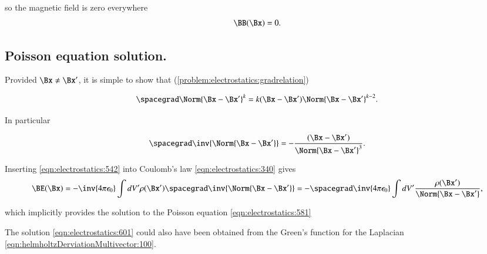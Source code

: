 so the magnetic field is zero everywhere
\begin{dmath}\label{eqn:electrostatics:320}
\BB(\Bx) = 0.
\end{dmath}


\subsection{Poisson equation solution.}

Provided \( \Bx \ne \Bx' \), it is simple to show that (\cref{problem:electrostatics:gradrelation})

\begin{dmath}\label{eqn:electrostatics:541}
\spacegrad \Norm{\Bx - \Bx'}^k = k (\Bx - \Bx') \Norm{ \Bx - \Bx' }^{k-2}.
\end{dmath}

In particular

\begin{dmath}\label{eqn:electrostatics:542}
\spacegrad \inv{\Norm{\Bx - \Bx'}} = - \frac{(\Bx - \Bx')}{\Norm{ \Bx - \Bx' }^{3}}.
\end{dmath}

Inserting \cref{eqn:electrostatics:542} into Coulomb's law \cref{eqn:electrostatics:340} gives
\begin{dmath}\label{eqn:electrostatics:661}
\BE(\Bx)
=
-\inv{4 \pi \epsilon_0} \int dV' \rho(\Bx') \spacegrad \inv{\Norm{\Bx - \Bx'}}
=
- \spacegrad \inv{4 \pi \epsilon_0} \int dV' \frac{\rho(\Bx')}{\Norm{\Bx - \Bx'}},
\end{dmath}

which implicitly provides the solution to the Poisson equation \cref{eqn:electrostatics:581}


The solution \cref{eqn:electrostatics:601} could also have been obtained from the Green's function for the Laplacian
\cref{eqn:helmholtzDerviationMultivector:100}.
